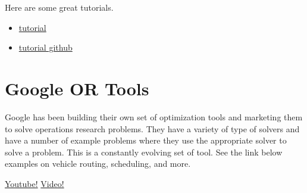 Here are some great tutorials.
\begin{itemize}
\item \href{https://jcutrer.com/python/learn-geopandas-plotting-usmaps}{tutorial}
\item \href{https://github.com/joncutrer/geopandas-tutorial}{tutorial github}
\end{itemize}
\section{Google OR Tools}
Google has been building their own set of optimization tools and marketing them to solve operations research problems.   They have a variety of type of solvers and have a number of example problems where they use the appropriate solver to solve a problem.   This is a constantly evolving set of tool. See the link below examples on vehicle routing, scheduling,  and more.  


\begin{center}
\end{center}

\href{https://www.youtube.com/watch?v=AJ6LeiMe_PQ&t=757s&ab_channel=MixedIntegerProgramming}{Youtube!}
\href{https://www.youtube.com/watch?v=iF2rHY318iU&ab_channel=MixedIntegerProgramming}{Video!}

